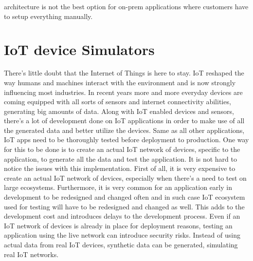 \documentclass[greek,english]{article}
\begin{document}
architecture is not the best option for on-prem applications where customers have to setup everything manually.\cite{whenmicroarebad}

\section{IoT device Simulators}

There's little doubt that the Internet of Things is here to stay. IoT reshaped the way humans and machines interact with the environment and is now strongly influencing most industries. In recent years more and more everyday devices are coming equipped with all sorts of sensors and internet connectivity abilities, generating big amounts of data. Along with IoT enabled devices and sensors, there's a lot of development done on IoT applications in order to make use of all the generated data and better utilize the devices. Same as all other applications, IoT apps need to be thoroughly tested before deployment to production. One way for this to be done is to create an actual IoT network of devices, specific to the application, to generate all the data and test the application. It is not hard to notice the issues with this implementation. First of all, it is very expensive to create an actual IoT network of devices, especially when there's a need to test on large ecosystems. Furthermore, it is very common for an application early in development to be redesigned and changed often and in such case IoT ecosystem used for testing will have to be redesigned and changed as well. This adds to the development cost and introduces delays to the development process. Even if an IoT network of devices is already in place for deployment reasons, testing an application using the live network can introduce security risks. Instead of using actual data from real IoT devices, synthetic data can be generated, simulating real IoT networks. 


\end{document}
